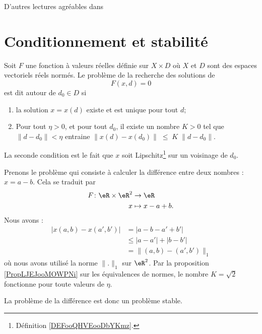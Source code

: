 
D'autres lectures agréables dans \cite{GianlucaB}

\section{Conditionnement et stabilité}

\begin{definition}      \label{DEFooYIFAooSJbMkC}
	Soit $F$ une fonction à valeurs réelles définie sur $X\times D$ où $X$ et $D$ sont des espaces vectoriels réels normés. Le problème de la recherche des solutions de
	\begin{equation}
		F(x,d)=0
	\end{equation}
	est dit  autour de \( d_0\in D\) si
	\begin{enumerate}
		\item
			la solution $x=x(d)$ existe et est unique pour tout $d$;
		\item \label{ItemProbStableB}
			Pour tout $\eta>0$, et pour tout $d_0$, il existe un nombre $K>0$ tel que $\| d-d_0\|<\eta$ entraine $\|x(d)-x(d_0)\|\;\leq\;K\;\|d-d_0\|$.
	\end{enumerate}
    La seconde condition est le fait que \( x\) soit Lipschitz\footnote{Définition \ref{DEFooQHVEooDbYKmz}.} sur un voisinage de \( d_0\).
\end{definition}

\begin{example}    \label{ExooXJONooTAYZVc}
    Prenons le problème qui consiste à calculer la différence entre deux nombres : \( x=a-b\). Cela se traduit par
    \begin{equation}
        \begin{aligned}
            F\colon \eR\times \eR^2&\to \eR \\
            x&\mapsto x-a+b. 
        \end{aligned}
    \end{equation}
    Nous avons : 
    \begin{subequations}
        \begin{align}
            \big| x(a,b)-x(a',b') \big|&=| a-b-a'+b' |\\
            &\leq| a-a' |+| b-b' |\\
            &=\|  (a,b)-(a',b')  \|_1
        \end{align}
    \end{subequations}
    où nous avons utilisé la norme \( \| . \|_1\) sur \( \eR^2\). Par la proposition \ref{PropLJEJooMOWPNi} sur les équivalences de normes, le nombre \( K=\sqrt{2}\) fonctionne pour toute valeurs de \( \eta\).

    La problème de la différence est donc un problème stable.
\end{example}

